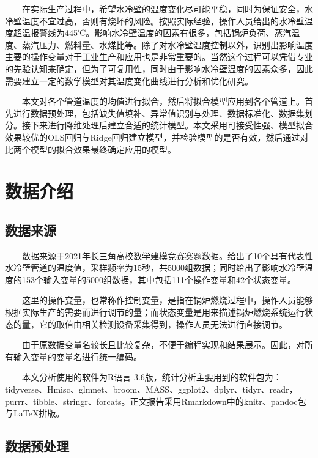 \documentclass[
]{article}
\begin{document}
  在实际生产过程中，希望水冷壁的温度变化尽可能平稳，同时为保证安全，水冷壁温度不宜过高，否则有烧坏的风险。按照实际经验，操作人员给出的水冷壁温度超温报警线为445℃。影响水冷壁温度的因素有很多，包括锅炉负荷、蒸汽温度、蒸汽压力、燃料量、水煤比等。除了对水冷壁温度控制以外，识别出影响温度主要的操作变量对于工业生产和应用也是非常重要的。当然这个过程可以凭借专业的先验认知来确定，但为了可复用性，同时由于影响水冷壁温度的因素众多，因此需要建立一定的数学模型对其温度变化曲线进行分析和优化研究。

  本文对各个管道温度的均值进行拟合，然后将拟合模型应用到各个管道上。首先进行数据预处理，包括缺失值填补、异常值识别与处理、数据标准化、数据集划分。接下来进行降维处理后建立合适的统计模型。本文采用可接受性强、模型拟合效果较优的OLS回归与Ridge回归建立模型，并检验模型的是否有效，然后通过对比两个模型的拟合效果最终确定应用的模型。

\hypertarget{ux6570ux636eux4ecbux7ecd}{%
\section{数据介绍}\label{ux6570ux636eux4ecbux7ecd}}

\hypertarget{ux6570ux636eux6765ux6e90}{%
\subsection{数据来源}\label{ux6570ux636eux6765ux6e90}}

  数据来源于2021年长三角高校数学建模竞赛赛题数据。给出了10个具有代表性水冷壁管道的温度值，采样频率为15秒，共5000组数据；同时给出了影响水冷壁温度的153个输入变量的5000组数据，其中包括111个操作变量和42个状态变量。

  这里的操作变量，也常称作控制变量，是指在锅炉燃烧过程中，操作人员能够根据实际生产的需要而进行调节的量；而状态变量是用来描述锅炉燃烧系统运行状态的量，它的取值由相关检测设备采集得到，操作人员无法进行直接调节。

  由于原数据变量名较长且比较复杂，不便于编程实现和结果展示。因此，对所有输入变量的变量名进行统一编码。

  本文分析使用的软件为R语言
3.6版，统计分析主要用到的软件包为：tidyverse、Hmisc、glmnet、broom、MASS、ggplot2、dplyr、tidyr、readr，purrr、tibble、stringr、forcats。正文报告采用Rmarkdown中的knitr、pandoc包与LaTeX排版。

\hypertarget{ux6570ux636eux9884ux5904ux7406}{%
\subsection{数据预处理}\label{ux6570ux636eux9884ux5904ux7406}}
\end{document}
